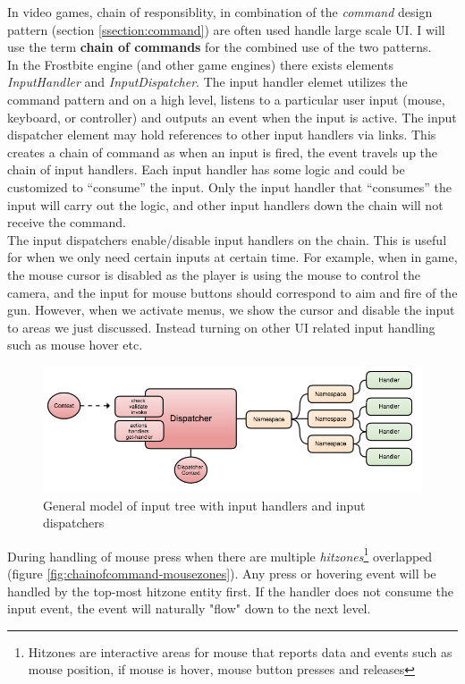 \begin{multicols}{2}
In video games, chain of responsiblity, in combination of the \textit{command} design pattern (section \ref{ssection:command}) are often used handle large scale UI. I will use the term \textbf{chain of commands} for the combined use of the two patterns.\bs
\\
In the Frostbite engine (and other game engines) there exists elements \textit{InputHandler} and \textit{InputDispatcher}. The input handler elemet utilizes the command pattern and on a high level, listens to a particular user input (mouse, keyboard, or controller) and outputs an event when the input is active. The input dispatcher element may hold references to other input handlers via links. This creates a chain of command as when an input is fired, the event travels up the chain of input handlers. Each input handler has some logic and could be customized to ``consume'' the input. Only the input handler that ``consumes'' the input will carry out the logic, and other input handlers down the chain will not receive the command.\bs
\\
The input dispatchers enable/disable input handlers on the chain. This is useful for when we only need certain inputs at certain time. For example, when in game, the mouse cursor is disabled as the player is using the mouse to control the camera, and the input for mouse buttons should correspond to aim and fire of the gun. However, when we activate menus, we show the cursor and disable the input to areas we just discussed. Instead turning on other UI related input handling such as mouse hover etc.\bs
\\

\begin{figure}[H]
	\centering
	\includegraphics[width=\fullwidth]{assets/inputdispatch}
	\caption{General model of input tree with input handlers and input dispatchers}
	\label{fig:inputdispatch}
\end{figure}

During handling of mouse press when there are multiple \textit{hitzones}\footnote{Hitzones are interactive areas for mouse that reports data and events such as mouse position, if mouse is hover, mouse button presses and releases} overlapped (figure \ref{fig:chainofcommand-mousezones}). Any press or hovering event will be handled by the top-most hitzone entity first. If the handler does not consume the input event, the event will naturally "flow" down to the next level.
\bs


\end{multicols}
